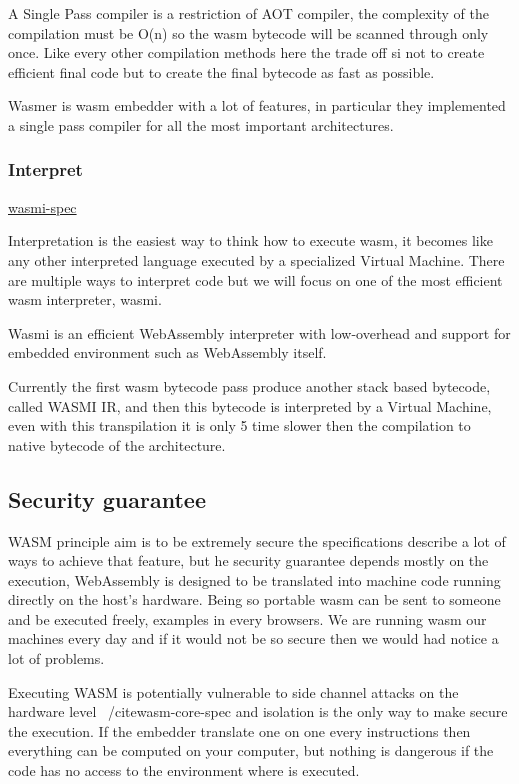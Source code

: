 \documentclass[../main.tex]{subfiles}
\begin{document}
A Single Pass compiler is a restriction of AOT compiler, the complexity of the compilation must be O(n) so the wasm bytecode will be scanned through only once. Like every other compilation methods here the trade off si not to create efficient final code but to create the final bytecode as fast as possible.

Wasmer is wasm embedder with a lot of features, in particular they implemented a single pass compiler for all the most important architectures.

\subsubsection{Interpret}
\href{https://github.com/paritytech/Wasmi}{wasmi-spec}

Interpretation is the easiest way to think how to execute wasm, it becomes like any other interpreted language executed by a specialized Virtual Machine. There are multiple ways to interpret code but we will focus on one of the most efficient wasm interpreter, wasmi.

Wasmi is an efficient WebAssembly interpreter with low-overhead and support for embedded environment such as WebAssembly itself. ~\cite{wasmi}

Currently the first wasm bytecode pass produce another stack based bytecode, called WASMI IR, and then this bytecode is interpreted by a Virtual Machine, even with this transpilation it is only 5 time slower then the compilation to native bytecode of the architecture.

\subsection{Security guarantee}

WASM principle aim is to be extremely secure the specifications describe a lot of ways to achieve that feature, but he security guarantee depends mostly on the execution, WebAssembly is designed to be translated into machine code running directly on the host’s hardware. Being so portable wasm can be sent to someone and be executed freely, examples in every browsers. We are running wasm our machines every day and if it would not be so secure then we would had notice a lot of problems.

Executing WASM is potentially vulnerable to side channel attacks on the hardware level ~/cite{wasm-core-spec} and isolation is the only way to make secure the execution. If the embedder translate one on one every instructions then everything can be computed on your computer, but nothing is dangerous if the code has no access to the environment where is executed.
\end{document}
